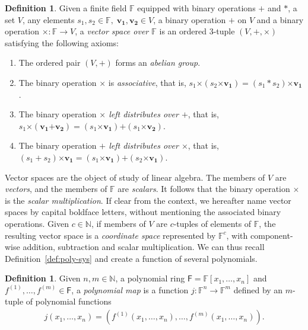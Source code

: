 \documentclass[english]{ufsc-thesis-rn46-2019/ufsc-thesis-rn46-2019}
\theoremstyle{definition}
\newtheorem{definition}[theorem]{Definition}
\begin{document}
\begin{definition}
  Given a finite field $\mathbb{F}$ equipped with binary operations $+$ and
  $\ast$, a set $V$, any elements
  $s_{1}, s_{2} \in \mathbb{F},\; \mathbf{v_{1}}, \mathbf{v_{2}} \in V$,
  a binary operation $\bm{+}$ on $V$ and a binary operation
  $\bm{\times} : \mathbb{F} \to V$, a \emph{vector space over $\mathbb{F}$} is
  an ordered $3$-tuple $(V, \bm{+}, \bm{\times})$ satisfying the following
  axioms:

  \begin{enumerate}
    \item The ordered pair $(V, \bm{+})$ forms an \emph{abelian group}.
    \item The binary operation $\bm{\times}$ is \emph{associative}, that is,
      $s_{1} \bm{\times} (s_{2} \bm{\times} \mathbf{v_{1}})
        = (s_{1} \ast s_{2}) \bm{\times} \mathbf{v_{1}}$.
    \item The binary operation \emph{$\bm{\times}$ left distributes over
      $\bm{+}$}, that is,
      $s_{1} \bm{\times} (\mathbf{v_{1}} \bm{+} \mathbf{v_{2}})
        = (s_{1} \bm{\times} \mathbf{v_{1}})
          \bm{+} (s_{1} \bm{\times} \mathbf{v_{2}})$.
    \item The binary operation \emph{$\bm{+}$ left distributes over
      $\bm{\times}$}, that is,
      $(s_{1} + s_{2}) \bm{\times} \mathbf{v_{1}}
        = (s_{1} \bm{\times} \mathbf{v_{1}})
          \bm{+} (s_{2} \bm{\times} \mathbf{v_{1}})$.
  \end{enumerate}
\end{definition}

Vector spaces are the object of study of linear algebra. The members of $V$ are
\emph{vectors}, and the members of $\mathbb{F}$ are \emph{scalars}. It follows
that the binary operation $\bm{\times}$ is the \emph{scalar multiplication}. If
clear from the context, we hereafter name vector spaces by capital boldface
letters, without mentioning the associated binary operations. Given
$c \in \mathbb{N}$, if members of $V$ are $c$-tuples of elements of
$\mathbb{F}$, the resulting vector space is a \emph{coordinate space}
represented by $\mathbb{F}^{c}$, with component-wise addition, subtraction and
scalar multiplication. We can thus recall Definition~\ref{def:poly-sys} and
create a function of several polynomials.

\begin{definition}\label{def:poly-map}
  Given $n, m \in \mathbb{N}$, a polynomial ring
  $\mathsf{F} = \mathbb{F}[x_{1}, \dots, x_{n}]$ and
  $f^{(1)}, \dots, f^{(m)} \in \mathsf{F}$, a \emph{polynomial map} is a
  function $j : \mathbb{F}^{n} \to \mathbb{F}^{m}$ defined by an $m$-tuple of
  polynomial functions
  \begin{align}
    j(x_{1}, \dots, x_{n})
      = (f^{(1)}(x_{1}, \dots, x_{n}), \dots, f^{(m)}(x_{1}, \dots, x_{n})).
  \end{align}
\end{definition}
\end{document}
